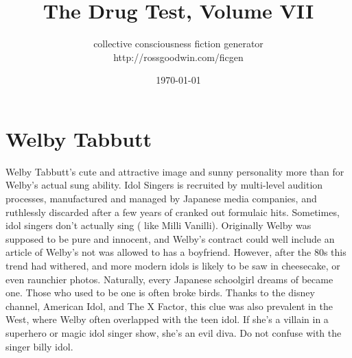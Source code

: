 \documentclass[12pt]{book}
\title{The Drug Test, Volume VII}
\author{collective consciousness fiction generator\\http://rossgoodwin.com/ficgen}
\date{\today}
\begin{document}
\maketitle



\chapter{Welby Tabbutt}

Welby Tabbutt's cute and attractive image and sunny personality more than for Welby's actual sung ability. Idol Singers is recruited by multi-level audition processes, manufactured and managed by Japanese media companies, and ruthlessly discarded after a few years of cranked out formulaic hits. Sometimes, idol singers don't actually sing ( like Milli Vanilli). Originally Welby was supposed to be pure and innocent, and Welby's contract could well include an article of Welby's not was allowed to has a boyfriend. However, after the 80s this trend had withered, and more modern idols is likely to be saw in cheesecake, or even raunchier photos. Naturally, every Japanese schoolgirl dreams of became one. Those who used to be one is often broke birds. Thanks to the disney channel, American Idol, and The X Factor, this clue was also prevalent in the West, where Welby often overlapped with the teen idol. If she's a villain in a superhero or magic idol singer show, she's an evil diva. Do not confuse with the singer billy idol.
\end{document}
